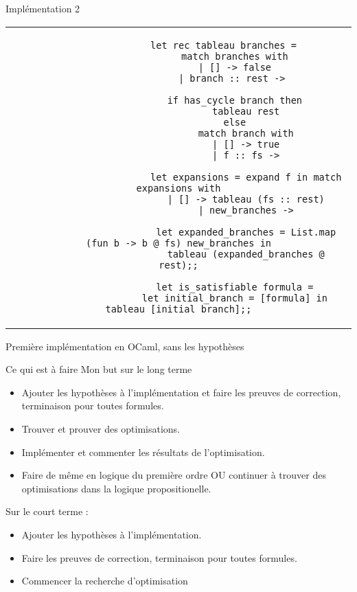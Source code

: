 \documentclass[]{beamer}
\begin{document}
\begin{frame}[fragile]{Implémentation 2}
    \begin{center}
        \begin{tabular}{c}
            \begin{lstlisting}
                let rec tableau branches =
                    match branches with
                    | [] -> false
                    | branch :: rest -> 

                    if has_cycle branch then
                        tableau rest
                    else
                        match branch with
                        | [] -> true
                        | f :: fs ->

                        let expansions = expand f in match expansions with
                        | [] -> tableau (fs :: rest)
                        | new_branches ->
                        
                        let expanded_branches = List.map (fun b -> b @ fs) new_branches in
                        tableau (expanded_branches @ rest);;

                    let is_satisfiable formula =
                    let initial_branch = [formula] in tableau [initial_branch];;
            \end{lstlisting}
        \end{tabular}

    Première implémentation en OCaml, sans les hypothèses
      \end{center}
\end{frame}

\begin{frame}{Ce qui est à faire}
    Mon but sur le long terme
    \begin{itemize}[<+->]
        \item Ajouter les hypothèses à l'implémentation et faire les preuves de correction, terminaison pour toutes formules.
        \item Trouver et prouver des optimisations.
        \item Implémenter et commenter les résultats de l'optimisation.
        \item Faire de même en logique du première ordre OU continuer à trouver des optimisations dans la logique propositionelle.
    \end{itemize}
    \pause
    Sur le court terme :
    \begin{itemize}[<+->]
        \item Ajouter les hypothèses à l'implémentation.
        \item Faire les preuves de correction, terminaison pour toutes formules.
        \item Commencer la recherche d'optimisation
    \end{itemize}
\end{frame}
\end{document}
